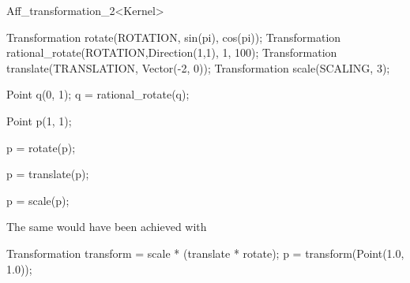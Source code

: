 \begin{ccRefClass}{Aff_transformation_2<Kernel>}
\begin{cprog}
  Transformation rotate(ROTATION, sin(pi), cos(pi));
  Transformation rational_rotate(ROTATION,Direction(1,1), 1, 100);
  Transformation translate(TRANSLATION, Vector(-2, 0));
  Transformation scale(SCALING, 3);

  Point q(0, 1);
  q = rational_rotate(q); 

  Point p(1, 1);

  p = rotate(p); 

  p = translate(p); 

  p = scale(p);
\end{cprog} 

The same would have been achieved with

\begin{cprog}

  Transformation transform = scale * (translate * rotate);
  p = transform(Point(1.0, 1.0));
\end{cprog} 

\ccSeeAlso
{} \\
 \\
 \\
 \\
 \\
 \\

\end{ccRefClass} 

